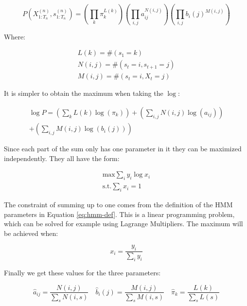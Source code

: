\begin{equation}
  P(X_{1: T_{n}}^{(n)}, s_{1: T_{n}}^{(n)})=\left(\prod_{k} \pi_{k}^{L(k)}\right)\left(\prod_{i, j} a_{i j}^{N(i, j)}\right)\left(\prod_{i, j} b_{i}(j)^{M(i, j)}\right) 
\end{equation}

Where:

\begin{equation}
  \begin{array}{c}
L(k)=\#\left(s_{1}=k\right) \\
N(i, j)=\#\left(s_{t}=i, s_{t+1}=j\right) \\
M(i, j)=\#\left(s_{t}=i, X_{t}=j\right)
\end{array} 
\end{equation}

It is simpler to obtain the maximum when taking the $\log$:

\begin{equation}
\begin{split}
  \log P=\left(\sum_{k} L(k) \log \left(\pi_{k}\right)\right)+\left(\sum_{i, j} N(i, j) \log \left(a_{i j}\right)\right)  \\
   +\left(\sum_{i, j} M(i, j) \log \left(b_{i}(j)\right)\right) 
\end{split}
\end{equation}

Since each part of the sum only has one parameter in it they can be maximized independently. They all have the form: 

\begin{equation}
   \begin{aligned}
\text{max} \sum_{i} y_{i} \log x_{i} \\
\text{s.t.} \sum_{i} x_{i}=1
   \end{aligned}
  \label{eq:lp-statement}
\end{equation}

The constraint of summing up to one comes from the definition of the HMM parameters in Equation \eqref{eq:hmm-def}. This is a linear programming problem, which can be solved for example using Lagrange Multipliers. The maximum will be achieved when: 

\begin{equation}
  x_{i}=\frac{y_{i}}{\sum_{i} y_{i}} 
  \label{eq:lp-solution}
\end{equation}

Finally we get these values for the three parameters: 

\begin{equation}
  \hat{a}_{i j}=\frac{N(i, j)}{\sum_{s} N(i, s)} \quad \hat{b}_{i}(j)=\frac{M(i, j)}{\sum_{s} M(i, s)} \quad \hat{\pi}_{k}=\frac{L(k)}{\sum_{s} L(s)} 
\end{equation}


